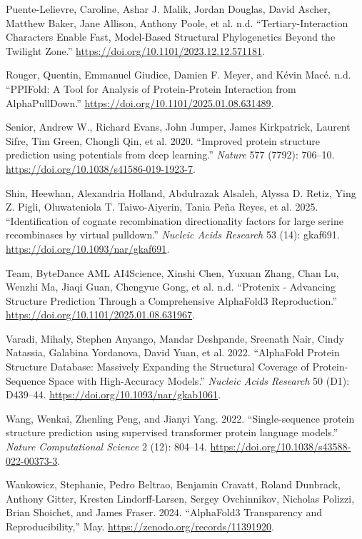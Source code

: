 \documentclass[
]{scrbook}
\newlength{\cslhangindent}
\newenvironment{CSLReferences}[2] %
 {\begin{list}{}{%
  \setlength{\itemindent}{0pt}
  \setlength{\leftmargin}{0pt}
  \setlength{\parsep}{0pt}
  \ifodd #1
   \setlength{\leftmargin}{\cslhangindent}
   \setlength{\itemindent}{-1\cslhangindent}
  \fi
  \setlength{\itemsep}{#2\baselineskip}}}
 {\end{list}}
\begin{document}
\begin{CSLReferences}{1}{0}
Puente-Lelievre, Caroline, Ashar J. Malik, Jordan Douglas, David Ascher,
Matthew Baker, Jane Allison, Anthony Poole, et al. n.d.
{``Tertiary-Interaction Characters Enable Fast, Model-Based Structural
Phylogenetics Beyond the Twilight Zone.''}
\url{https://doi.org/10.1101/2023.12.12.571181}.

Rouger, Quentin, Emmanuel Giudice, Damien F. Meyer, and Kévin Macé. n.d.
{``PPIFold: A Tool for Analysis of Protein-Protein Interaction from
AlphaPullDown.''} \url{https://doi.org/10.1101/2025.01.08.631489}.

Senior, Andrew W., Richard Evans, John Jumper, James Kirkpatrick,
Laurent Sifre, Tim Green, Chongli Qin, et al. 2020. {``Improved protein
structure prediction using potentials from deep learning.''}
\emph{Nature} 577 (7792): 706--10.
\url{https://doi.org/10.1038/s41586-019-1923-7}.

Shin, Heewhan, Alexandria Holland, Abdulrazak Alsaleh, Alyssa D. Retiz,
Ying Z. Pigli, Oluwateniola T. Taiwo-Aiyerin, Tania Peña Reyes, et al.
2025. {``Identification of cognate recombination directionality factors
for large serine recombinases by virtual pulldown.''} \emph{Nucleic
Acids Research} 53 (14): gkaf691.
\url{https://doi.org/10.1093/nar/gkaf691}.

Team, ByteDance AML AI4Science, Xinshi Chen, Yuxuan Zhang, Chan Lu,
Wenzhi Ma, Jiaqi Guan, Chengyue Gong, et al. n.d. {``Protenix -
Advancing Structure Prediction Through a Comprehensive AlphaFold3
Reproduction.''} \url{https://doi.org/10.1101/2025.01.08.631967}.

Varadi, Mihaly, Stephen Anyango, Mandar Deshpande, Sreenath Nair, Cindy
Natassia, Galabina Yordanova, David Yuan, et al. 2022. {``AlphaFold
Protein Structure Database: Massively Expanding the Structural Coverage
of Protein-Sequence Space with High-Accuracy Models.''} \emph{Nucleic
Acids Research} 50 (D1): D439--44.
\url{https://doi.org/10.1093/nar/gkab1061}.

Wang, Wenkai, Zhenling Peng, and Jianyi Yang. 2022. {``Single-sequence
protein structure prediction using supervised transformer protein
language models.''} \emph{Nature Computational Science} 2 (12): 804--14.
\url{https://doi.org/10.1038/s43588-022-00373-3}.

Wankowicz, Stephanie, Pedro Beltrao, Benjamin Cravatt, Roland Dunbrack,
Anthony Gitter, Kresten Lindorff-Larsen, Sergey Ovchinnikov, Nicholas
Polizzi, Brian Shoichet, and James Fraser. 2024. {``AlphaFold3
Transparency and Reproducibility,''} May.
\url{https://zenodo.org/records/11391920}.


\end{CSLReferences}
\end{document}

